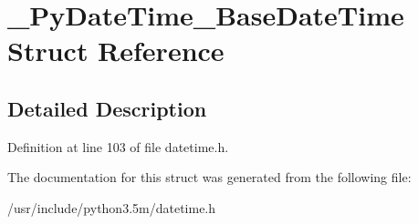 \hypertarget{struct__PyDateTime__BaseDateTime}{}\section{\+\_\+\+Py\+Date\+Time\+\_\+\+Base\+Date\+Time Struct Reference}
\label{struct__PyDateTime__BaseDateTime}


\subsection{Detailed Description}


Definition at line 103 of file datetime.\+h.



The documentation for this struct was generated from the following file\+:\begin{DoxyCompactItemize}
\item 
/usr/include/python3.\+5m/datetime.\+h\end{DoxyCompactItemize}
